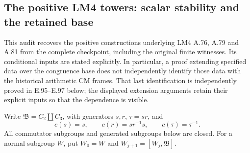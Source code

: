 \subsection{The positive LM4 towers: scalar stability and the retained base}

This audit recovers the positive constructions underlying LM4 A.76,
A.79 and A.81 from the complete checkpoint, including the original
finite witnesses.  Its conditional inputs are stated explicitly.
In particular, a proof extending specified data over the congruence
base does not independently identify those data with the historical
arithmetic CM frames.  That last identification is independently
proved in E.95--E.97 below; the displayed extension arguments
retain their explicit inputs so that the dependence is visible.

Write \(\mathfrak B=C_2\amalg C_3\), with generators \(s,r\),
\(\tau=sr\), and
\[
 c(s)=s,\qquad c(r)=sr^{-1}s,\qquad c(\tau)=\tau^{-1}.
\]
All commutator subgroups and generated subgroups below are closed.
For a normal subgroup \(W\), put \(W_0=W\) and
\(W_{j+1}=[W_j,\mathfrak B]\).

